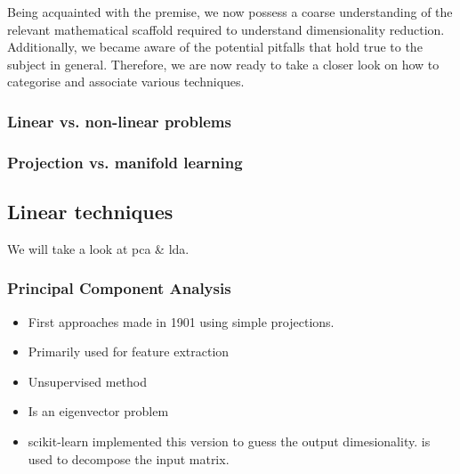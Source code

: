 Being acquainted with the premise, we now possess a coarse understanding of the relevant mathematical scaffold required to understand dimensionality reduction.
Additionally, we became aware of the potential pitfalls that hold true to the subject in general.
Therefore, we are now ready to take a closer look on how to categorise and associate various techniques.

\subsubsection{Linear vs. non-linear problems}


\clearpage

\subsubsection{Projection vs. manifold learning}


\clearpage

\subsection{Linear techniques}

We will take a look at \gls{pca} \& \gls{lda}.





\subsubsection{Principal Component Analysis}

\begin{itemize}
	\item First approaches made in 1901 using simple projections. \cite{pearson1901liii}
	\item Primarily used for feature extraction \cite{PythonMachineLearningCh5}
	\item Unsupervised method \cite{PythonMachineLearningCh5}
	\item Is an eigenvector problem \cite{MultilinearSubspaceLearningCh2}
	\item scikit-learn implemented this version \cite{minka2000automatic} to guess the output dimesionality. \cite{halko2009finding} is used to decompose the input matrix.
\end{itemize}

\clearpage

